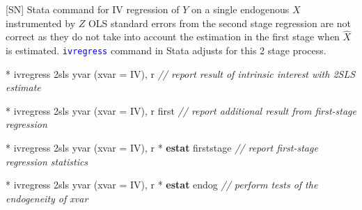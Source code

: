 \documentclass[
  10pt,
  ignorenonframetext,
]{beamer}
\newenvironment{Shaded}{\begin{snugshade}}{\end{snugshade}}
\newcommand{\CommentTok}[1]{\textcolor[rgb]{0.56,0.35,0.01}{\textit{#1}}}
\newcommand{\FunctionTok}[1]{\textcolor[rgb]{0.00,0.00,0.00}{#1}}
\newcommand{\KeywordTok}[1]{\textcolor[rgb]{0.13,0.29,0.53}{\textbf{#1}}}
\newcommand{\NormalTok}[1]{#1}
\begin{document}
\begin{frame}[fragile]{{[}SN{]} Stata command for IV regression of \(Y\)
on a single endogenous \(X\) instrumented by \(Z\)}
\protect\hypertarget{sn-stata-command-for-iv-regression-of-y-on-a-single-endogenous-x-instrumented-by-z}{}
OLS standard errors from the second stage regression are not correct as
they do not take into account the estimation in the first stage when
\(\hat{X}\) is estimated. \textcolor{blue}{\texttt{ivregress}} command
in Stata adjusts for this 2 stage process.

\small

\begin{Shaded}
\begin{Highlighting}[]
\NormalTok{* ivregress 2sls yvar (xvar = IV), }\FunctionTok{r}
\CommentTok{// report result of intrinsic interest with 2SLS estimate}
\end{Highlighting}
\end{Shaded}

\begin{Shaded}
\begin{Highlighting}[]
\NormalTok{* ivregress 2sls yvar (xvar = IV), }\FunctionTok{r}\NormalTok{ first}
\CommentTok{// report additional result from first{-}stage regression}
\end{Highlighting}
\end{Shaded}

\begin{Shaded}
\begin{Highlighting}[]
\NormalTok{* ivregress 2sls yvar (xvar = IV), }\FunctionTok{r}
\NormalTok{* }\KeywordTok{estat}\NormalTok{ firststage}
\CommentTok{// report first{-}stage regression statistics}
\end{Highlighting}
\end{Shaded}

\begin{Shaded}
\begin{Highlighting}[]
\NormalTok{* ivregress 2sls yvar (xvar = IV), }\FunctionTok{r}
\NormalTok{* }\KeywordTok{estat}\NormalTok{ endog}
\CommentTok{// perform tests of the endogeneity of xvar}
\end{Highlighting}
\end{Shaded}
\end{frame}
\end{document}
